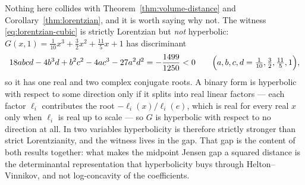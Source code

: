 Nothing here collides with Theorem~\ref{thm:volume-distance} and
Corollary~\ref{thm:lorentzian}, and it is worth saying why not.  The witness
\eqref{eq:lorentzian-cubic} is strictly Lorentzian but \emph{not} hyperbolic:
$G(x,1)=\frac1{10}x^3+\frac32x^2+\frac{11}5x+1$ has discriminant
\[
18abcd-4b^3d+b^2c^2-4ac^3-27a^2d^2=-\frac{1499}{1250}<0
\qquad
\Bigl(a,b,c,d=\tfrac1{10},\tfrac32,\tfrac{11}5,1\Bigr),
\]
so it has one real and two complex conjugate roots.  A binary form is hyperbolic
with respect to some direction only if it splits into real linear factors --- each
factor $\ell_i$ contributes the root $-\ell_i(x)/\ell_i(e)$, which is real for
every real $x$ only when $\ell_i$ is real up to scale --- so $G$ is hyperbolic
with respect to no direction at all.  In two variables hyperbolicity is therefore
strictly stronger than strict Lorentzianity, and the witness lives in the gap.
That gap is the content of both results together: what makes the midpoint Jensen
gap a squared distance is the determinantal representation that hyperbolicity
buys through Helton--Vinnikov, and not log-concavity of the coefficients.

